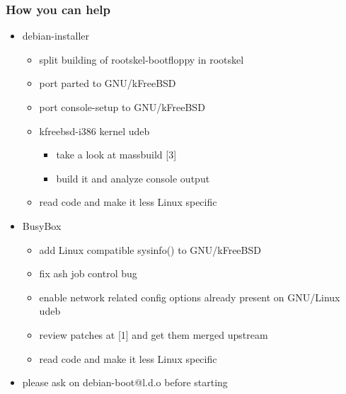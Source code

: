 \documentclass{beamer}
\begin{document}
\begin{frame}
  \frametitle{How you can help}

  \begin{itemize}
  \item
    debian-installer
    \begin{itemize}
    \item
      split building of rootskel-bootfloppy in rootskel
    \item
      port parted to GNU/kFreeBSD
    \item
      port console-setup to GNU/kFreeBSD
    \item
      kfreebsd-i386 kernel udeb
      \begin{itemize}
      \item
        take a look at massbuild [3]
      \item
        build it and analyze console output
      \end{itemize}
    \item
      read code and make it less Linux specific
    \end{itemize}
  \item
    BusyBox
    \begin{itemize}
    \item
      add Linux compatible sysinfo() to GNU/kFreeBSD
    \item
      fix ash job control bug
    \item
      enable network related config options already present on GNU/Linux udeb
    \item
      review patches at [1] and get them merged upstream
    \item
      read code and make it less Linux specific
    \end{itemize}
  \end{itemize}

  \begin{itemize}
  \item
    please ask on debian-boot@l.d.o before starting
  \end{itemize}

\end{frame}
\end{document}
